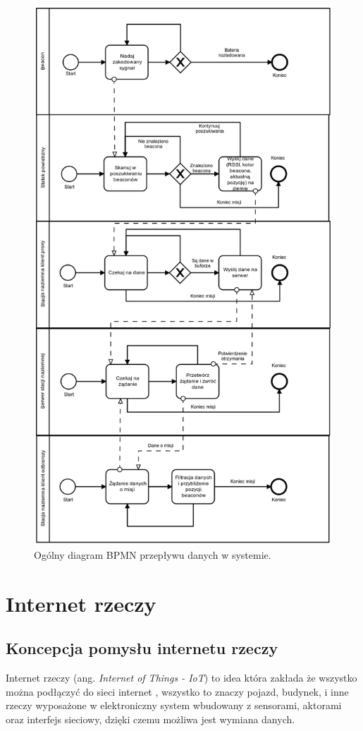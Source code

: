 \begin{figure}[!th]
    \centering
    \includegraphics[width=12.8cm]{zalaczniki/obrazy/diagram_ogolny.png}
    \caption{Ogólny diagram BPMN przepływu danych w systemie.}
    \label{fig:diagramogolny}
\end{figure}

\section{Internet rzeczy}
\subsection{Koncepcja pomysłu internetu rzeczy}
Internet rzeczy (ang. \textit{Internet of Things - IoT}) to idea która zakłada że wszystko można podłączyć do sieci internet \cite{iot}, wszystko to znaczy pojazd, budynek, i inne rzeczy wyposażone w elektroniczny system wbudowany z sensorami, aktorami oraz interfejs sieciowy, dzięki czemu możliwa jest wymiana danych. 

